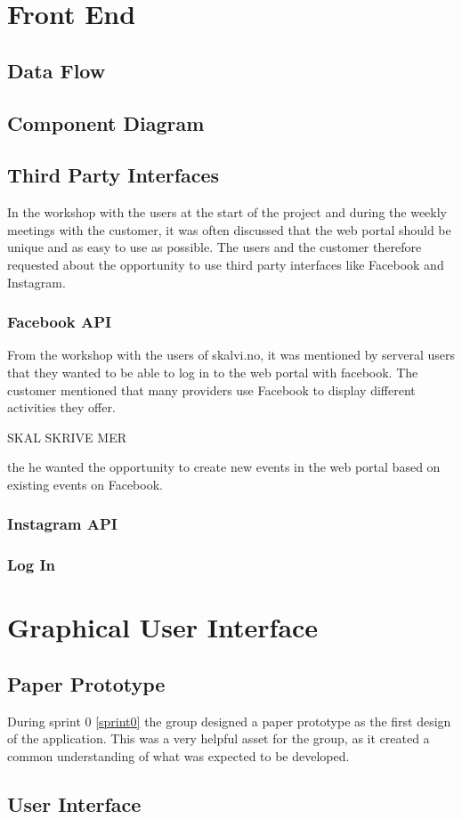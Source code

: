 \section{Front End}

\subsection{Data Flow}

\subsection{Component Diagram}

\subsection{Third Party Interfaces}
In the workshop with the users at the start of the project and during the weekly meetings with the customer, it was often discussed that the web portal should be unique and as easy to use as possible. The users and the customer therefore requested about the opportunity to use third party interfaces like Facebook and Instagram. 
\subsubsection{Facebook API}
From the workshop with the users of skalvi.no, it was mentioned by serveral users that they wanted to be able to log in to the web portal with facebook. 
The customer mentioned that many providers use Facebook to display different activities they offer. 

SKAL SKRIVE MER

the he wanted the opportunity to create new events in the web portal based on existing events on Facebook.  
\subsubsection{Instagram API}
\subsubsection{Log In}

\section{Graphical User Interface}

\subsection{Paper Prototype}
During sprint 0 \ref{sprint0} the group designed a paper prototype as the first design of the application. This was a very helpful asset for the group, as it created a common understanding of what was expected to be developed.  

\subsection{User Interface}

\cleardoublepage
